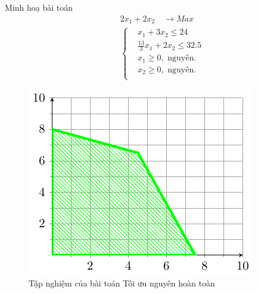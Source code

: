 \documentclass[10pt]{beamer}
\begin{document}
\begin{frame} {Minh hoạ bài toán}
    \begin{equation}
        \begin{split}
        \quad & 2x_1 + 2x_2 \quad \longrightarrow Max \\
                    & \left\{\begin{split}
                    & x_1 + 3x_2 \leq 24 \\
                    & \frac{13}{3}x_1 + 2x_2 \leq 32.5 \\
                    &x_1 \geq 0, \text{ nguyên}. \\
                    &x_2 \geq 0, \text{ nguyên}. \\
                    \end{split}\right.    
        \end{split}
    \end{equation}            
\end{frame}
\begin{frame}
\begin{figure}[h]
    \centering
    \includegraphics[width=0.7\linewidth]{nguyenhoantoan.pdf}
    \caption{Tập nghiệm của bài toán Tối ưu nguyên hoàn toàn}
\end{figure}
\end{frame}
\end{document}
